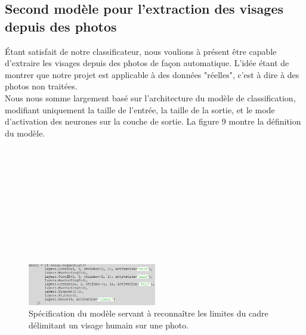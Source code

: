\documentclass{article}
\begin{document}
\subsection{Second modèle pour l'extraction des visages depuis des photos }
Étant satisfait de notre classificateur, nous voulions à présent être capable d'extraire les visages depuis des photos de façon automatique. L'idée étant de montrer que notre projet est applicable à des données "réelles", c'est à dire à des photos non traitées.\\
Nous nous somme largement basé sur l'architecture du modèle de classification, modifiant uniquement la taille de l'entrée, la taille de la sortie, et le mode d'activation des neurones sur la couche de sortie. La figure 9 montre la définition du modèle.\\\\\\\\\\\\\\\\\\\\\\
\begin{figure}[hpt]
\centering
\includegraphics[width=0.5\textwidth]{model_face_extrator.png}
\caption{\label{fig:Input}Spécification du modèle servant à reconnaître les limites du cadre délimitant un visage humain sur une photo.\\}
\end{figure}
\end{document}
